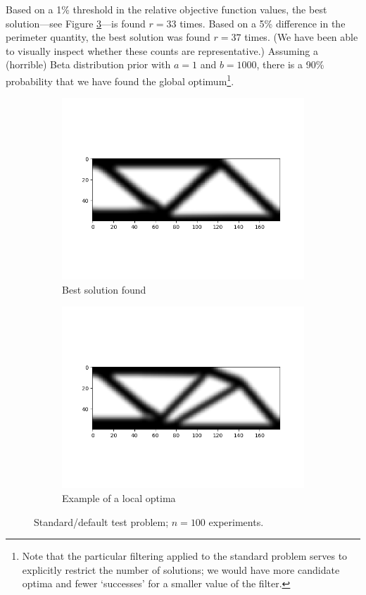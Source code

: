 \documentclass[11pt]{article}
\begin{document}
Based on a 1\% threshold in the relative objective function values, the best solution---see Figure \ref{fig:top02}---is found $r=33$ times. Based on a 5\% difference in the perimeter quantity, the best solution was found $r=37$ times. (We have been able to visually inspect whether these counts are representative.) Assuming a (horrible) Beta distribution prior with $a=1$ and $b=1000$, there is a 90\% probability that we have found the global optimum\footnote{Note that the particular filtering applied to the standard problem serves to explicitly restrict the number of solutions; we would have more candidate optima and fewer `successes' for a smaller value of the filter\cite{munro2018design}.}.
\begin{figure}
\centering
\begin{subfigure}{0.4\textwidth}
\centering
\includegraphics[scale=0.55, trim={2.05cm 4cm 1cm 4cm},clip]{topo_58.png}
\caption{Best solution found \label{fig:glo02}}
\end{subfigure} \hfill
\begin{subfigure}{0.4\textwidth}
\centering
\includegraphics[scale=0.55, trim={2.05cm 4cm 1cm 4cm},clip]{topo_11.png}
\caption{Example of a local optima \label{fig:loc02}}
\end{subfigure}
\caption{Standard/default test problem; $n=100$ experiments. \label{fig:top02}}
\end{figure}
\end{document}
